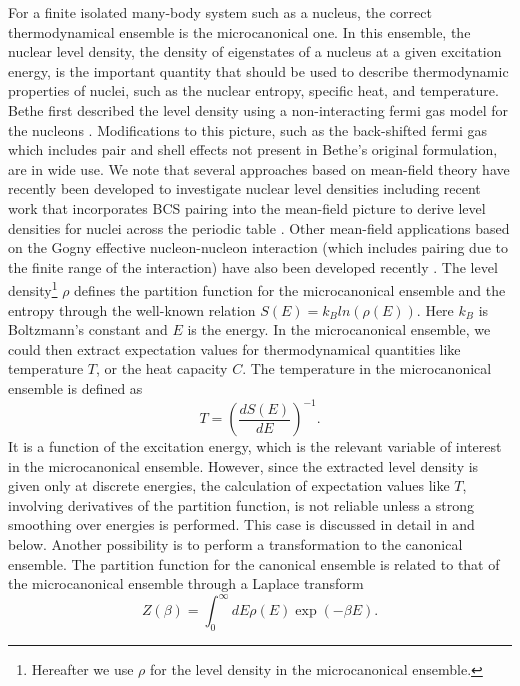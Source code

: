 \documentclass[rmp,aps,floatfix]{revtex4}
\begin{document}
For a finite isolated many-body system such as a nucleus, the correct
thermodynamical ensemble is the microcanonical one. In this ensemble,
the nuclear level density, the density of eigenstates of a nucleus
at a given excitation energy, is the important quantity that should be
used to describe thermodynamic properties of nuclei, such as the 
nuclear entropy, specific heat, and temperature. 
Bethe first described the level density using a 
non-interacting fermi gas model
for the nucleons \cite{bethe1}. Modifications to this picture, such as the 
back-shifted fermi gas which includes pair and
shell effects \cite{back_shift}
not present in Bethe's original formulation, are in 
wide use.  We note that several approaches based on mean-field 
theory have recently been developed to 
investigate nuclear level densities including recent work 
that incorporates BCS pairing into the mean-field picture 
to derive level densities for nuclei across the periodic table 
\cite{demetriou01}. Other mean-field applications based on the
Gogny effective nucleon-nucleon interaction (which includes 
pairing due to the finite range of the interaction) have also been 
developed recently \cite{hilaire01}. 
The level density\footnote{Hereafter we use $\rho$ for the level 
density in the microcanonical ensemble.} 
$\rho$ defines the partition function for 
the microcanonical ensemble and the entropy through the well-known
relation $S(E)=k_Bln(\rho(E))$.
Here $k_B$ is Boltzmann's constant and $E$ is the energy.  In 
the microcanonical ensemble, we could then extract expectation values 
for thermodynamical quantities like temperature $T$, or the 
heat capacity $C$. The temperature in the microcanonical ensemble 
is defined as 
\begin{equation}
      T=\left(\frac{dS(E)}{dE}\right)^{-1}.
      \label{eq:temp}
\end{equation}
It is a function of the excitation energy, which is 
the relevant variable of interest in the microcanonical ensemble. 
However, since the extracted level density is given only at discrete 
energies, the calculation of expectation values 
like $T$, involving derivatives of the partition function, is not
reliable unless a strong smoothing over energies is 
performed. This case is discussed in detail in  \cite{oslo3} 
and below. Another possibility
is to perform a transformation to the canonical ensemble.
The partition function for the 
canonical ensemble is related to that of the 
microcanonical ensemble through a Laplace transform
\begin{equation}
     Z(\beta)=\int_0^{\infty}dE\rho(E)\exp{(-\beta E)}.
     \label{eq:zcan}
\end{equation}
\end{document}
